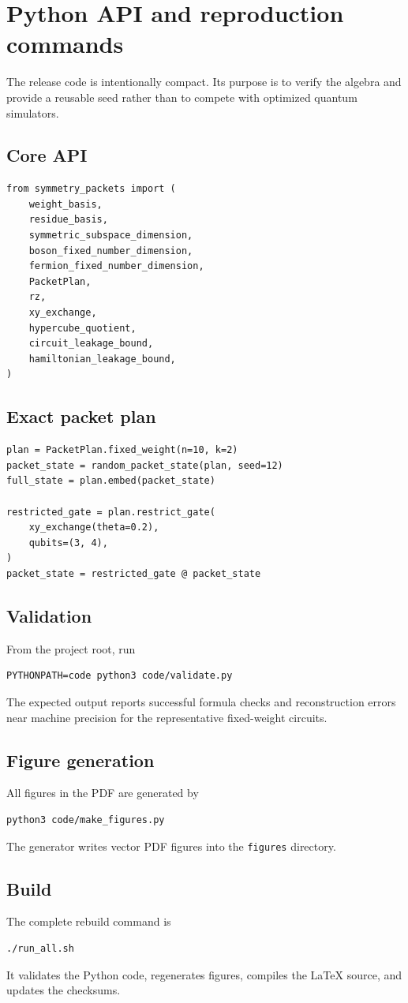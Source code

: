 \chapter{Python API and reproduction commands}
\label{app:python}

The release code is intentionally compact. Its purpose is to verify the algebra and provide a reusable seed rather than to compete with optimized quantum simulators.

\section{Core API}
\begin{lstlisting}[style=pythonstyle,caption={Core packet API.}]
from symmetry_packets import (
    weight_basis,
    residue_basis,
    symmetric_subspace_dimension,
    boson_fixed_number_dimension,
    fermion_fixed_number_dimension,
    PacketPlan,
    rz,
    xy_exchange,
    hypercube_quotient,
    circuit_leakage_bound,
    hamiltonian_leakage_bound,
)
\end{lstlisting}

\section{Exact packet plan}
\begin{lstlisting}[style=pythonstyle,caption={Fixed-weight packet compilation.}]
plan = PacketPlan.fixed_weight(n=10, k=2)
packet_state = random_packet_state(plan, seed=12)
full_state = plan.embed(packet_state)

restricted_gate = plan.restrict_gate(
    xy_exchange(theta=0.2),
    qubits=(3, 4),
)
packet_state = restricted_gate @ packet_state
\end{lstlisting}

\section{Validation}
From the project root, run
\begin{lstlisting}[style=pythonstyle]
PYTHONPATH=code python3 code/validate.py
\end{lstlisting}
The expected output reports successful formula checks and reconstruction errors near machine precision for the representative fixed-weight circuits.

\section{Figure generation}
All figures in the PDF are generated by
\begin{lstlisting}[style=pythonstyle]
python3 code/make_figures.py
\end{lstlisting}
The generator writes vector PDF figures into the \texttt{figures} directory.

\section{Build}
The complete rebuild command is
\begin{lstlisting}[style=pythonstyle]
./run_all.sh
\end{lstlisting}
It validates the Python code, regenerates figures, compiles the LaTeX source, and updates the checksums.
